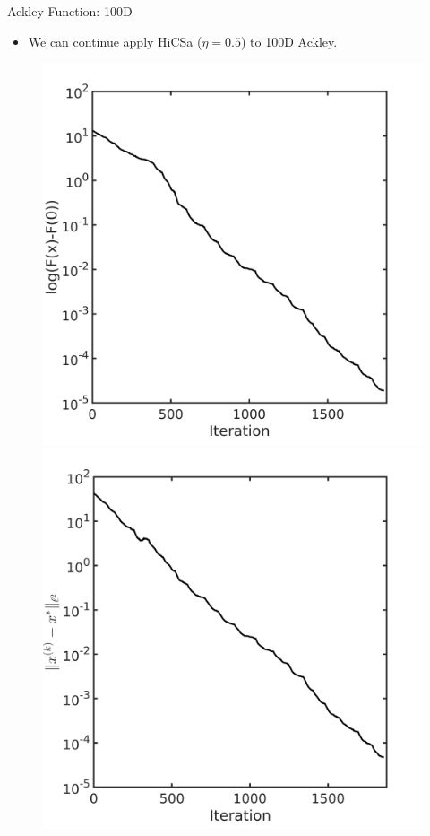 \documentclass{beamer}
\begin{document}
\begin{frame}{Ackley Function: 100D}
	\begin{itemize}
		\item We can continue apply HiCSa ($\eta=0.5$) to 100D Ackley.
	\end{itemize}
\begin{figure}[!htbp]
	\centering
	  \includegraphics[scale=0.2]{./figures/ackley100D.png}
	  \includegraphics[scale=0.2]{./figures/ackley100D_dist.png}
\end{figure}
\end{frame}
\end{document}
